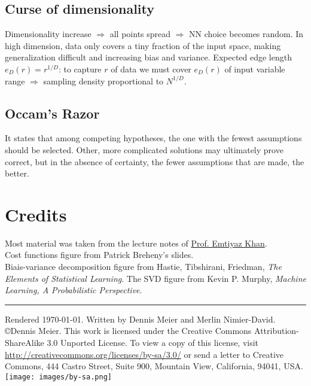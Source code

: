 \documentclass[10pt,a4paper,landscape]{extarticle}
\begin{document}
\begin{multicols*}{4}
\subsection{Curse of dimensionality}
Dimensionality increase $\Rightarrow$ all points spread $\Rightarrow$ NN choice becomes random. 
In high dimension, data only covers a tiny fraction of the input space, making generalization difficult and increasing bias and variance.
Expected edge length $e_D(r) = r^{1/D}$: to capture $r$ of data we must cover $e_D(r)$ of input variable range $\Rightarrow$ sampling density proportional to $N^{1/D}$.





\subsection{Occam's Razor}
It states that among competing hypotheses, the one with the fewest assumptions should be selected. Other, more complicated solutions may ultimately prove correct, but in the absence of certainty, the fewer assumptions that are made, the better.


\section{Credits}
Most material was taken from the lecture notes of \href{http://people.epfl.ch/228491}{Prof. Emtiyaz Khan}.\\
Cost functions figure from Patrick Breheny's slides.\\
Biais-variance decomposition figure from Hastie, Tibshirani, Friedman, \textit{The Elements of Statistical Learning}.
The SVD figure from Kevin P. Murphy, \textit{Machine Learning, A Probabilistic Perspective}.

\hrule
\tiny
Rendered \today. Written by Dennis Meier and Merlin Nimier-David.
\copyright Dennis Meier. This work is licensed under the Creative Commons Attribution-ShareAlike 3.0 Unported License.
To view a copy of this license, visit \href{http://creativecommons.org/licenses/by-sa/3.0/}{http://creativecommons.org/licenses/by-sa/3.0/} or
send a letter to Creative Commons, 444 Castro Street, Suite 900, Mountain View, California, 94041, USA.
\texttt{[image: images/by-sa.png]}

\end{multicols*}
\end{document}
